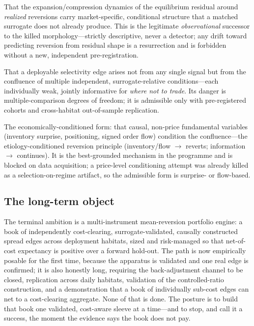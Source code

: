 \documentclass[11pt,a4paper]{article}
\newcommand{\status}[1]{{\small\textsc{[#1]}}}
\begin{document}
\begin{description}[leftmargin=1.4em,itemsep=2pt]
  \item[H-Residual-Growth \normalfont(\status{deferred}).] That the expansion/compression dynamics of
  the equilibrium residual around \emph{realized} reversions carry market-specific, conditional
  structure that a matched surrogate does not already produce. This is the legitimate \emph{observational}
  successor to the killed morphology---strictly descriptive, never a detector; any drift toward predicting
  reversion from residual shape is a resurrection and is forbidden without a new, independent
  pre-registration.
  \item[H-Confluence \normalfont(\status{open}).] That a deployable selectivity edge arises not from any
  single signal but from the confluence of multiple independent, surrogate-relative conditions---each
  individually weak, jointly informative for \emph{where not to trade}. Its danger is multiple-comparison
  degrees of freedom; it is admissible only with pre-registered cohorts and cross-habitat
  out-of-sample replication.
  \item[H-Econ-Confluence \normalfont(\status{deferred}, data-gated, long-term only).] The
  economically-conditioned form: that causal, non-price fundamental variables (inventory surprise,
  positioning, signed order flow) condition the confluence---the etiology-conditioned reversion principle
  (inventory/flow $\rightarrow$ reverts; information $\rightarrow$ continues). It is the best-grounded
  mechanism in the programme and is blocked on data acquisition; a price-level conditioning attempt was
  already killed as a selection-on-regime artifact, so the admissible form is surprise- or flow-based.
\end{description}

\subsection{The long-term object}

The terminal ambition is a multi-instrument mean-reversion portfolio engine: a book of independently
cost-clearing, surrogate-validated, causally constructed spread edges across deployment habitats, sized
and risk-managed so that net-of-cost expectancy is positive over a forward hold-out. The path is now
empirically posable for the first time, because the apparatus is validated and one real edge is
confirmed; it is also honestly long, requiring the back-adjustment channel to be closed, replication
across daily habitats, validation of the controlled-ratio construction, and a demonstration that a book
of individually sub-cost edges can net to a cost-clearing aggregate. None of that is done. The posture
is to build that book one validated, cost-aware sleeve at a time---and to stop, and call it a success,
the moment the evidence says the book does not pay.
\end{document}
